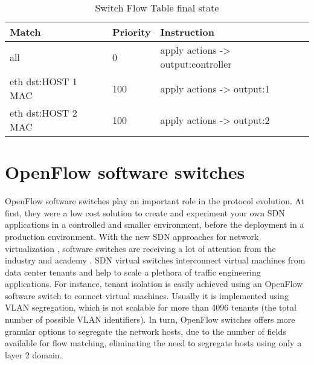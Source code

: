 \begin{enumerate}
\begin{table}[h]
\centering
\caption{Switch Flow Table final state}
\label{tab:finaltable}
\begin{tabular}{|l|l|l|}
\hline
\textbf{Match}                 & \textbf{Priority}   & \textbf{Instruction}                              \\ \hline
all                            & 0                   & apply actions -> output:controller                \\ \hline
eth dst:HOST 1 MAC             & 100                 & apply actions -> output:1                         \\ \hline
eth dst:HOST 2 MAC             & 100                 & apply actions -> output:2                         \\ \hline
\end{tabular}
\end{table}


\end{enumerate}        

\section{OpenFlow software switches}
\label{sec:sec22}

OpenFlow software switches play an important role in the protocol evolution. At first, they were a low cost solution to create and experiment your own SDN applications in a controlled and smaller environment, before the deployment in a production environment. With the new SDN approaches for network virtualization \cite{Tseng:2011:NVC:2117686.2118540} \cite{Drutskoy_scalablenetwork}, software switches are receiving a lot of attention from the industry \cite{NSX} and academy \cite{DBLP:confcloudnetEmmerichRWC14}. SDN virtual switches interconnect virtual machines from data center tenants and help to scale a plethora of traffic engineering applications. For instance, tenant isolation is easily achieved using an OpenFlow software switch to connect virtual machines. Usually it is implemented using VLAN segregation, which is not scalable for more than 4096 tenants (the total number of possible VLAN identifiers). In turn, OpenFlow switches offers more granular options to segregate the network hosts, due to the number of fields available for flow matching, eliminating the need to segregate hosts using only a layer 2 domain.

